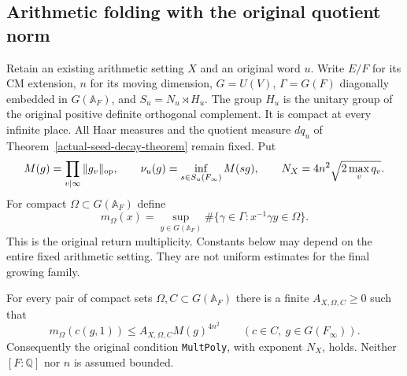\subsection{Arithmetic folding with the original quotient norm}
\label{global-gram-continuation}

Retain an existing arithmetic setting $X$ and an original word $u$.
Write $E/F$ for its CM extension, $n$ for its moving dimension,
$G=U(V)$, $\Gamma=G(F)$ diagonally embedded in $G(\mathbb A_F)$,
and $S_u=N_u\rtimes H_u$.  The group $H_u$ is the unitary group of
the original positive definite orthogonal complement.  It is compact
at every infinite place.  All Haar measures and the quotient measure
$dq_u$ of Theorem~\ref{actual-seed-decay-theorem} remain fixed.
Put
\[
 M(g)=\prod_{v\mid\infty}\|g_v\|_{\rm op},\qquad
 \nu_u(g)=\inf_{s\in S_u(F_\infty)}M(sg),\qquad
 N_X=4n^2\sqrt{2\max_vq_v}.
\]
For compact $\Omega\subset G(\mathbb A_F)$ define
\[
 m_\Omega(x)=\sup_{y\in G(\mathbb A_F)}
 \#\{\gamma\in\Gamma:x^{-1}\gamma y\in\Omega\}.
\]
This is the original return multiplicity.  Constants below may depend
on the entire fixed arithmetic setting.  They are not uniform estimates
for the final growing family.\cite{global-gram-continuation-source}

\begin{theorem}
\label{global-gram-multiplicity}
For every pair of compact sets $\Omega,C\subset G(\mathbb A_F)$
there is a finite $A_{X,\Omega,C}\ge0$ such that
\begin{equation}\label{global-gram-mult-bound}
 m_\Omega(c(g,1))\le A_{X,\Omega,C}M(g)^{4n^2}
 \qquad(c\in C,\ g\in G(F_\infty)).
\end{equation}
Consequently the original condition \texttt{MultPoly}, with exponent
$N_X$, holds.  Neither $[F:\mathbb Q]$ nor $n$ is assumed bounded.
\end{theorem}

